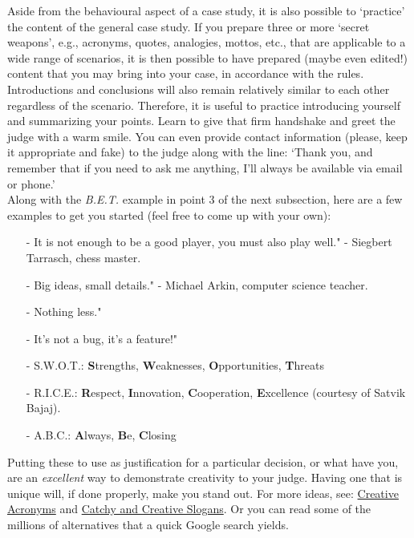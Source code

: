 \documentclass[12pt]{article}
\begin{document}
Aside from the behavioural aspect of a case study, it is also possible to \lq practice' the content of the general case study. If you prepare three or more \lq secret weapons', e.g., acronyms, quotes, analogies, mottos, etc., that are applicable to a wide range of scenarios, it is then possible to have prepared (maybe even edited!) content that you may bring into your case, in accordance with the rules. Introductions and conclusions will also remain relatively similar to each other regardless of the scenario. Therefore, it is useful to practice introducing yourself and summarizing your points. Learn to give that firm handshake and greet the judge with a warm smile. You can even provide contact information (please, keep it appropriate and fake) to the judge along with the line: \lq Thank you, and remember that if you need to ask me anything, I'll always be available via email or phone.' \\

Along with the \textit{B.E.T.} example in point 3 of the next subsection, here are a few examples to get you started (feel free to come up with your own):

\begin{itemize}
	\item[-] \ldq It is not enough to be a good player, you must also play well." - Siegbert Tarrasch, chess master.
	\item[-] \ldq Big ideas, small details." - Michael Arkin, computer science teacher.
	\item[-] \ldq Nothing less."
	\item[-] \ldq It's not a bug, it's a feature!"
	\item[-] S.W.O.T.: \textbf{S}trengths, \textbf{W}eaknesses, \textbf{O}pportunities, \textbf{T}hreats
	\item[-] R.I.C.E.: \textbf{R}espect, \textbf{I}nnovation, \textbf{C}ooperation, \textbf{E}xcellence (courtesy of Satvik Bajaj).
	\item[-] A.B.C.: \textbf{A}lways, \textbf{B}e, \textbf{C}losing
\end{itemize}

Putting these to use as justification for a particular decision, or what have you, are an \textit{excellent} way to demonstrate creativity to your judge. Having one that is unique will, if done properly, make you stand out. For more ideas, see: \href{http://bighow.com/news/100-useful-acronyms-that-teach-us-about-writing-creativity-and-problem-solving-self-improvement-communication-and-more}{Creative Acronyms} and \href{http://www.hongkiat.com/blog/77-catchy-and-creative-slogans/}{Catchy and Creative Slogans}. Or you can read some of the millions of alternatives that a quick Google search yields. \\
\end{document}
